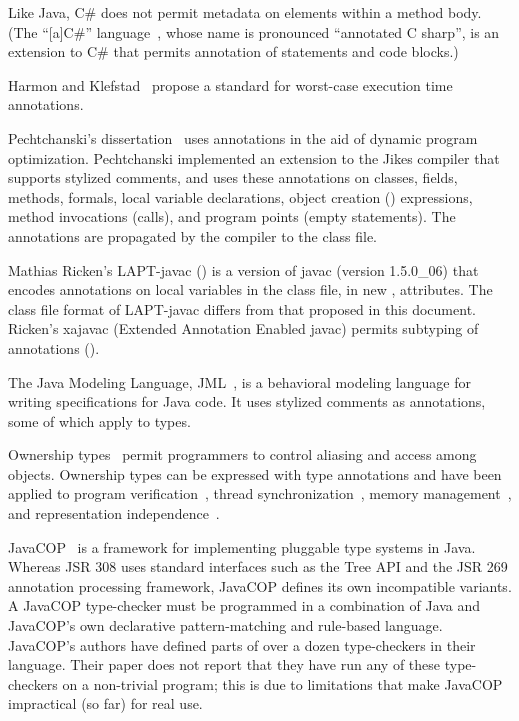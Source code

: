 \documentclass[10pt]{article}
\begin{document}
Like Java, C\# does not permit
metadata on elements within a method body.
(The ``[a]C\#'' language~\cite{CazzolaCC2005:JOT}, whose name is pronounced
``annotated C sharp'', is an extension to C\# that permits annotation of
statements and code blocks.)

Harmon and Klefstad~\cite{HarmonK2007} propose a standard for worst-case
execution time annotations.


Pechtchanski's dissertation~\cite{Pechtchanski2003} uses annotations in the
aid of dynamic program optimization.  Pechtchanski implemented an extension
to the Jikes compiler that supports stylized comments, and uses these
annotations on classes, fields, methods, formals, local variable
declarations, object creation () expressions, method invocations
(calls), and program points (empty statements).  The annotations are
propagated by the compiler to the class file.


Mathias Ricken's LAPT-javac
() is a version
of javac (version 1.5.0\_06) that
encodes annotations on local variables in the class file, in new
, attributes.
The class file format of LAPT-javac differs from that proposed in this
document.
Ricken's xajavac (Extended Annotation Enabled
javac) permits subtyping of annotations ().


The Java Modeling Language, JML~\cite{LeavensBR2006:JML}, is a behavioral
modeling language for writing specifications for Java code.  It uses
stylized comments as annotations, some of which apply to types.


Ownership types~\cite{ClarkePN98,Boyapati2004:PhD,Clark2001,ClarkD2002,PotaninNCB2006,NobleVP98,DietlM2005,LeinoM2004,YuP2006}
permit programmers to control aliasing and access among objects.  Ownership
types can be expressed with type annotations
and have been applied to program
verification~\cite{LeinoM2004,Muller2002,MullerPHL2006}, thread
synchronization~\cite{BoyapatiLR2002,JacobsPLS2005}, memory
management~\cite{AndreaCGNVZ2006,BoyapatiSBR2003}, and representation
independence~\cite{BanerjeeN2002}.


JavaCOP~\cite{AndreaeNMM2006} is a framework for implementing pluggable
type systems in Java.  Whereas JSR 308 uses standard
interfaces such as the Tree API and the JSR 269 annotation processing
framework, JavaCOP defines its own incompatible variants.
A JavaCOP type-checker must be programmed in a combination of Java and
JavaCOP's own declarative pattern-matching and rule-based language.
JavaCOP's authors have defined parts of over a dozen
type-checkers in their language.  Their paper does not report that they have
run any of these type-checkers on a non-trivial program; this is due to
limitations that make JavaCOP impractical (so far) for real use.
\end{document}
